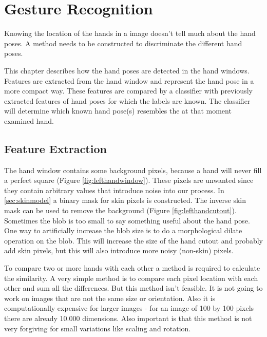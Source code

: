 
\chapter{Gesture Recognition}
\label{ch:gestures}

Knowing the location of the hands in a image doesn't tell much about the hand poses. A method needs to be constructed to discriminate the different hand poses.

This chapter describes how the hand poses are detected in the hand windows. Features are extracted from the hand window and represent the hand pose in a more compact way. These features are compared by a classifier with previously extracted features of hand poses for which the labels are known. The classifier will determine which known hand pose(s) resembles the at that moment examined hand.


\section{Feature Extraction}
The hand window contains some background pixels, because a hand will never fill a perfect square (Figure \autoref{fig:lefthandwindow}). These pixels are unwanted since they contain arbitrary values that introduce noise into our process. In \autoref{sec:skinmodel} a binary mask for skin pixels is constructed. The inverse skin mask can be used  to remove the background (Figure \autoref{fig:lefthandcutout}). Sometimes the blob is too small to say something useful about the hand pose. One way to artificially increase the blob size is to do a morphological dilate operation on the blob. This will increase the size of the hand cutout and probably add skin pixels, but this will also introduce more noisy (non-skin) pixels.

To compare two or more hands with each other a method is required to calculate the similarity. A very simple method is to compare each pixel location with each other and sum all the differences. But this method isn't feasible. It is not going to work on images that are not the same size or orientation. Also it is computationally expensive for larger images - for an image of 100 by 100 pixels there are already 10.000 dimensions. Also important is that this method is not very forgiving for small variations like scaling and rotation.


